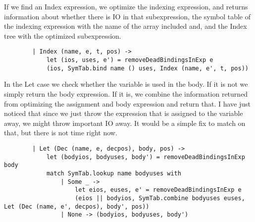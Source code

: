 If we find an Index expression, we optimize the indexing expression, and returns information about whether there is IO in that subexpression, the symbol table of the indexing expression with the name of the array included and, and the Index tree with the optimized subexpression.
\begin{verbatim}
        | Index (name, e, t, pos) ->
            let (ios, uses, e') = removeDeadBindingsInExp e
            (ios, SymTab.bind name () uses, Index (name, e', t, pos)) 
\end{verbatim}

In the Let case we check whether the variable is used in the body. If it is not we simply return the body expression. If it is, we combine the information returned from optimizing the assignment and body expression and return that. I have just noticed that since we just throw the expression that is assigned to the variable away, we might throw important IO away. It would be a simple fix to match on that, but there is not time right now.
\begin{verbatim}
        | Let (Dec (name, e, decpos), body, pos) ->
            let (bodyios, bodyuses, body') = removeDeadBindingsInExp body
            match SymTab.lookup name bodyuses with
                | Some _ ->
                    let eios, euses, e' = removeDeadBindingsInExp e
                    (eios || bodyios, SymTab.combine bodyuses euses, Let (Dec (name, e', decpos), body', pos))
                | None -> (bodyios, bodyuses, body') 
\end{verbatim}
